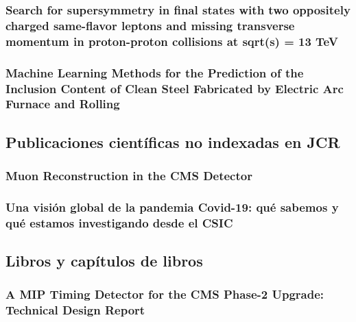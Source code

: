 \documentclass[a4paper, 11pt, twoside, openright]{report}
\begin{document}
\subsubsection{Search for supersymmetry in final states with two oppositely charged same-flavor leptons and missing transverse momentum in proton-proton collisions at sqrt(s) = 13 TeV}

\subsubsection{Machine Learning Methods for the Prediction of the Inclusion Content of Clean Steel Fabricated by Electric Arc Furnace and Rolling}




\subsection{Publicaciones científicas no indexadas en JCR}

\subsubsection{Muon Reconstruction in the CMS Detector}


\subsubsection{Una visión global de la pandemia Covid-19: qué sabemos y qué estamos investigando desde el CSIC}




\subsection{Libros y capítulos de libros}
\subsubsection{A MIP Timing Detector for the CMS Phase-2 Upgrade: Technical Design Report}

\end{document}
